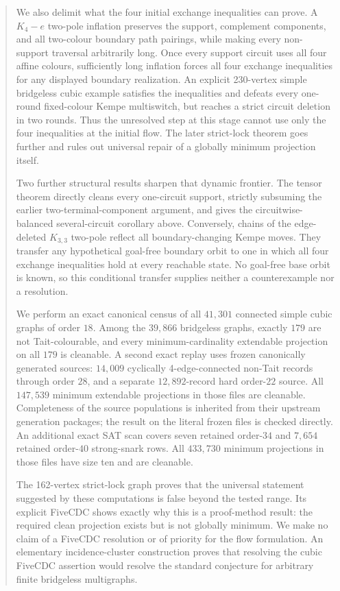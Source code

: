 \documentclass[11pt]{article}
\theoremstyle{definition}
\theoremstyle{remark}
\begin{document}
\begin{abstract}
We also delimit what the four initial exchange inequalities can prove.
A \(K_4-e\) two-pole inflation preserves the support, complement
components, and all two-colour boundary path pairings, while making every
non-support traversal arbitrarily long.  Once every support circuit uses
all four affine colours, sufficiently long inflation forces all four
exchange inequalities for any displayed boundary realization.  An
explicit 230-vertex simple bridgeless cubic example satisfies the
inequalities and defeats every one-round fixed-colour Kempe multiswitch,
but reaches a strict circuit deletion in two rounds.  Thus the unresolved
step at this stage cannot use only the four inequalities at the initial
flow.  The later strict-lock theorem goes further and rules out universal
repair of a globally minimum projection itself.

Two further structural results sharpen that dynamic frontier.  The tensor
theorem directly cleans every one-circuit support, strictly subsuming the
earlier two-terminal-component argument, and gives the circuitwise-balanced
several-circuit corollary above.  Conversely, chains of the
edge-deleted \(K_{3,3}\) two-pole reflect all boundary-changing Kempe
moves.  They transfer any hypothetical goal-free boundary orbit to one in
which all four exchange inequalities hold at every reachable state.  No
goal-free base orbit is known, so this conditional transfer supplies
neither a counterexample nor a resolution.

We perform an exact canonical census of all \(41{,}301\) connected simple
cubic graphs of order \(18\).  Among the \(39{,}866\) bridgeless graphs,
exactly \(179\) are not Tait-colourable, and every minimum-cardinality
extendable projection on all \(179\) is cleanable.  A second exact replay
uses frozen canonically generated sources: \(14{,}009\) cyclically
4-edge-connected non-Tait records through order \(28\), and a separate
\(12{,}892\)-record hard order-\(22\) source.  All \(147{,}539\) minimum
extendable projections in those files are cleanable.  Completeness of the
source populations is inherited from their upstream generation packages;
the result on the literal frozen files is checked directly.
An additional exact SAT scan covers seven retained order-\(34\) and
\(7{,}654\) retained order-\(40\) strong-snark rows.  All \(433{,}730\)
minimum projections in those files have size ten and are cleanable.

The 162-vertex strict-lock graph proves that the universal statement
suggested by these computations is false beyond the tested range.
Its explicit FiveCDC shows exactly why this is a proof-method result:
the required clean projection exists but is not globally minimum.  We
make no claim of a FiveCDC resolution or of priority for the flow
formulation.  An elementary incidence-cluster construction proves that
resolving the cubic FiveCDC assertion would resolve the standard
conjecture for arbitrary finite bridgeless multigraphs.
\end{abstract}
\end{document}

